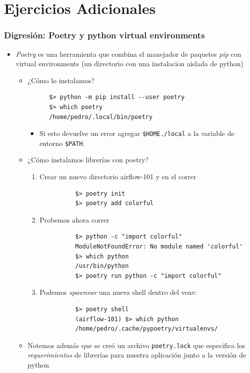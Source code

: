 \documentclass[leqno, 10pt, envcountsect]{beamer}
\numberwithin{equation}{section}
\theoremstyle{definition}
\theoremstyle{example}
\numberwithin{figure}{section}
\numberwithin{table}{section}
\let\olditem\item
\renewcommand{\item}{%
\olditem\vspace{1pt}}
\begin{document}
\section{Ejercicios Adicionales}
\label{sec:ejercicios_adicionales}

\begin{frame}[fragile=singleslide]
  \frametitle{Digresión: Poetry y python virtual environments}
  \begin{itemize}
    \item \textit{Poetry} es una herramienta que combina el manejador de
      paquetes \textit{pip} con virtual environments (un directorio con una
      instalacion aislada de python)
    \begin{itemize}
      \item ¿Cómo lo instalamos?
      \begin{verbatim}
      $> python -m pip install --user poetry
      $> which poetry
      /home/pedro/.local/bin/poetry
      \end{verbatim}
      \begin{itemize}
        \item Si esto devuelve un error agregar \texttt{\$HOME./local} a la
          variable de entorno \texttt{\$PATH}.
      \end{itemize}
      \item ¿Cómo instalamos librerías con poetry?
        \begin{enumerate}
          \item Crear un nuevo directorio airflow-101 y en el correr
          \begin{verbatim}
          $> poetry init
          $> poetry add colorful
          \end{verbatim}
        \item Probemos ahora correr
          \begin{verbatim}
          $> python -c "import colorful"
          ModuleNotFoundError: No module named 'colorful'
          $> which python
          /usr/bin/python
          $> poetry run python -c "import colorful"
          \end{verbatim}
        \item Podemos \textit{spawnear} una nueva shell dentro del venv:
          \begin{verbatim}
          $> poetry shell
          (airflow-101) $> which python
          /home/pedro/.cache/pypoetry/virtualenvs/
          \end{verbatim}
        \end{enumerate}
    \item Notemos además que se creó un archivo \texttt{poetry.lock} que
      especifica los \textit{requerimientos} de librerías para nuestra
        aplicación junto a la versión de python
    \end{itemize}
  \end{itemize}
\end{frame}
\end{document}
